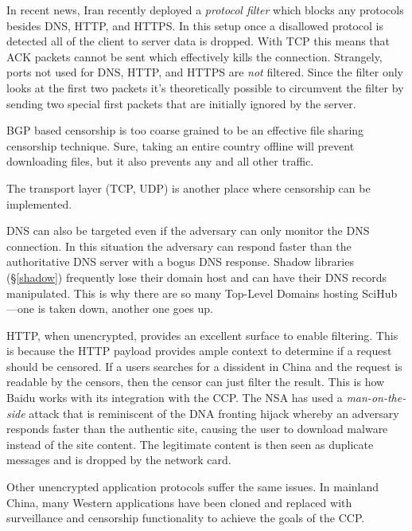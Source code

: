 In recent news, Iran recently deployed a \emph{protocol filter} which blocks any
protocols besides DNS, HTTP, and HTTPS.
\cite{bockDetectingEvadingCensorshipDepth} In this setup once a disallowed
protocol is detected all of the client to server data is dropped. With TCP this
means that ACK packets cannot be sent which effectively kills the connection.
\cite[\S 4.1]{bockDetectingEvadingCensorshipDepth} Strangely, ports not used for
DNS, HTTP, and HTTPS are \emph{not} filtered. Since the filter only looks at the
first two packets it's theoretically possible to circumvent the filter by
sending two special first packets that are initially ignored by the server.

BGP based censorship is too coarse grained to be an effective file sharing
censorship technique. Sure, taking an entire country offline will prevent
downloading files, but it also prevents any and all other traffic.\cite[p.\@
      5]{wendzelSurveyInternetCensorship2025}

The transport layer (TCP, UDP) is another place where censorship can be
implemented.\cite[p.\@ 5]{wendzelSurveyInternetCensorship2025}

DNS can also be targeted even if the adversary can only monitor the DNS
connection. In this situation the adversary can respond faster than the
authoritative DNS server with a bogus DNS response.\cite[p.\@
      6]{wendzelSurveyInternetCensorship2025} Shadow libraries (\S \ref{shadow})
frequently lose their domain host and can have their DNS records manipulated.
This is why there are so many Top-Level Domains hosting SciHub---one is taken
down, another one goes up.

HTTP, when unencrypted, provides an excellent surface to enable filtering. This
is because the HTTP payload provides ample context to determine if a request
should be censored. If a users searches for a dissident in China and the request
is readable by the censors, then the censor can just filter the result. This is
how Baidu works with its integration with the CCP. The NSA has used a
\emph{man-on-the-side} attack that is reminiscent of the DNA fronting hijack
whereby an adversary responds faster than the authentic site, causing the user
to download malware instead of the site content. The legitimate content is then
seen as duplicate messages and is dropped by the network card.

Other unencrypted application protocols suffer the same issues. In mainland
China, many Western applications have been cloned and replaced with surveillance
and censorship functionality to achieve the goals of the CCP.

